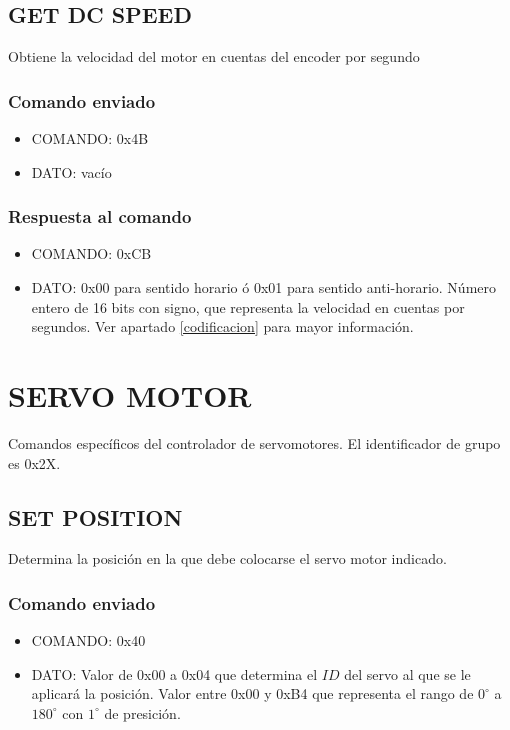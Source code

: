 \documentclass[a4paper,10pt]{article}
\begin{document}
\subsection{GET DC SPEED}
\label{set_dc_speed}

Obtiene la velocidad del motor en cuentas del encoder por segundo

\subsubsection*{Comando enviado}
\begin{itemize}
	\item{COMANDO:} 0x4B
	\item{DATO:} vac\'io
\end{itemize}

\subsubsection*{Respuesta al comando}

\begin{itemize}
	\item{COMANDO:} 0xCB
	\item{DATO:} 0x00 para sentido horario \'o 0x01 para sentido anti-horario.
		N\'umero entero de 16 bits con signo, que representa la velocidad en cuentas por segundos.
		Ver apartado \ref{codificacion} para mayor informaci\'on.
\end{itemize}

\section{SERVO MOTOR}
\label{grupo_servo_motor}

Comandos espec\'ificos del controlador de servomotores.
El identificador de grupo es 0x2X.

\subsection{SET POSITION}
\label{set_position}

Determina la posici\'on en la que debe colocarse el servo motor indicado.

\subsubsection*{Comando enviado}

\begin{itemize}
	\item{COMANDO:} 0x40
	\item{DATO:} Valor de 0x00 a 0x04 que determina el $ID$ del servo al que se le aplicar\'a la posici\'on.
	Valor entre 0x00 y 0xB4 que representa el rango de $0^{\circ}$ a $180^{\circ}$ con $1^{\circ}$ de presici\'on.
\end{itemize}
\end{document}
